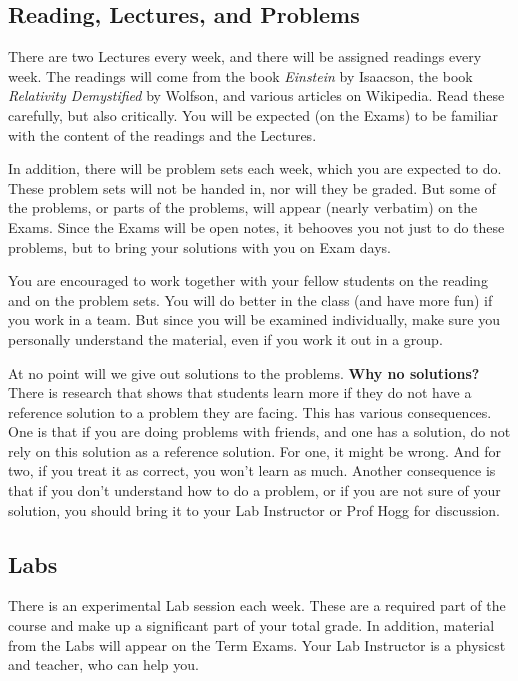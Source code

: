 \documentclass[12pt]{article}
\begin{document}
\subsection*{Reading, Lectures, and Problems}

There are two Lectures every week, and there
will be assigned readings every week.
The readings will come from the book \textit{Einstein} by Isaacson,
the book \textit{Relativity Demystified} by Wolfson,
and various articles on Wikipedia.
Read these carefully, but also critically.
You will be expected (on the Exams) to be familiar with the content of
the readings and the Lectures.

In addition, there will be problem sets each week, which you are
expected to do.
These problem sets will not be handed in, nor will they be graded.
But some of the problems, or parts of the problems, will appear
(nearly verbatim) on the Exams.
Since the Exams will be open notes, it behooves you not just to do
these problems, but to bring your solutions with you on Exam days.

You are encouraged to work together with your fellow students on the
reading and on the problem sets.
You will do better in the class (and have more fun) if you work in a
team.
But since you will be examined individually, make sure you personally
understand the material, even if you work it out in a group.

At no point will we give out solutions to the problems. \textbf{Why no
  solutions?} There is research that shows that students learn more if
they do not have a reference solution to a problem they are
facing. This has various consequences. One is that if you are doing
problems with friends, and one has a solution, do not rely on this
solution as a reference solution. For one, it might be wrong. And for
two, if you treat it as correct, you won't learn as much. Another
consequence is that if you don't understand how to do a problem, or if
you are not sure of your solution, you should bring it to your Lab
Instructor or Prof Hogg for discussion.

\subsection*{Labs}

There is an experimental Lab session each week. These are a required
part of the course and make up a significant part of your total grade.
In addition, material from the Labs will appear on the Term Exams.
Your Lab Instructor is a physicst and teacher, who can help you.
\end{document}
